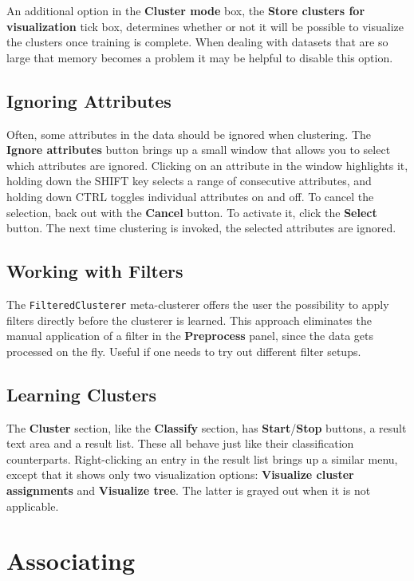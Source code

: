 \documentclass[a4paper]{article}
\begin{document}
An additional option in the \textbf{Cluster mode} box, the \textbf{Store
clusters for visualization} tick box, determines whether or not it will be
possible to visualize the clusters once training is complete. When dealing
with datasets that are so large that memory becomes a problem it may be
helpful to disable this option.

\subsection{Ignoring Attributes}

Often, some attributes in the data should be ignored when clustering.  The
\textbf{Ignore attributes} button brings up a small window that allows you to
select which attributes are ignored.  Clicking on an attribute in the window
highlights it, holding down the SHIFT key selects a range of consecutive
attributes, and holding down CTRL toggles individual attributes on and off. To
cancel the selection, back out with the \textbf{Cancel} button. To activate it,
click the \textbf{Select} button. The next time clustering is invoked, the
selected attributes are ignored.

\subsection{Working with Filters}

The \texttt{FilteredClusterer} meta-clusterer offers the user the possibility 
to apply filters directly before the clusterer is learned. This approach
eliminates the manual application of a filter in the \textbf{Preprocess} panel,
since the data gets processed on the fly. Useful if one needs to try out 
different filter setups.

\subsection{Learning Clusters}

The \textbf{Cluster} section, like the \textbf{Classify} section, has
\textbf{Start}/\textbf{Stop} buttons, a result text area and a result
list. These all behave just like their classification counterparts.
Right-clicking an entry in the result list brings up a similar menu,
except that it shows only two visualization options: \textbf{Visualize
cluster assignments} and \textbf{Visualize tree}. The latter is grayed
out when it is not applicable.

\newpage

\section{Associating}
\end{document}
